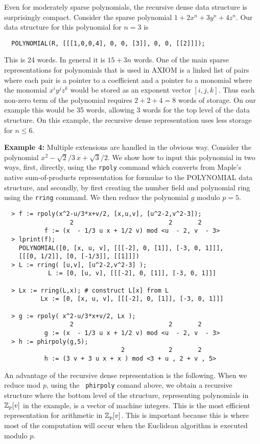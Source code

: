 \documentclass[10pt]{article}
\begin{document}
\medskip
{} Even for moderately sparse polynomials,
the recursive dense data structure is surprisingly compact. Consider
the sparse polynomial $1+2x^n+3y^n+4z^n.$ Our data structure for
this polynomial for $n=3$ is
\begin{verbatim}
  POLYNOMIAL(R, [[[1,0,0,4], 0, 0, [3]], 0, 0, [[2]]]);
\end{verbatim}
\noindent This is 24 words.  In general it is $15+3n$ words. One of
the main sparse representations for polynomials that is used in
AXIOM is a linked list of pairs where each pair is a pointer to a
coefficient and a pointer to a monomial where the monomial $x^i y^j
z^k$ would be stored as an exponent vector $[i,j,k]$.  Thus each
non-zero term of the polynomial requires $2+2+4=8$ words of storage.
On our example this would be 35 words, allowing 3 words for the top
level of the data structure. On this example, the recursive dense
representation uses less storage for $n \le 6$.

\medskip
\noindent
{\bf Example 4:} Multiple extensions are handled in the obvious way.
Consider the polynomial $x^2 - \sqrt{2}/3 \ x + \sqrt{3}/2.$
We show how to input this polynomial in two ways, first,
directly, using the {\tt rpoly} command which
converts from Maple's native sum-of-products
representation for formulae to the POLYNOMIAL data structure,
and secondly, by first creating the number field and
polynomial ring using the {\tt rring} command.
We then reduce the polynomial $g$ modulo $p=5$.
{
\begin{verbatim}
  > f := rpoly(x^2-u/3*x+v/2, [x,u,v], [u^2-2,v^2-3]);
                  2                          2       2
           f := (x  - 1/3 u x + 1/2 v) mod <u  - 2, v  - 3>
  > lprint(f);
    POLYNOMIAL([0, [x, u, v], [[[-2], 0, [1]], [-3, 0, 1]]],
    [[[0, 1/2]], [0, [-1/3]], [[1]]])
  > L := rring( [u,v], [u^2-2,v^2-3] );
            L := [0, [u, v], [[[-2], 0, [1]], [-3, 0, 1]]]

  > Lx := rring(L,x); # construct L[x] from L
          Lx := [0, [x, u, v], [[[-2], 0, [1]], [-3, 0, 1]]]

  > g := rpoly( x^2-u/3*x+v/2, Lx );
                  2                          2       2
           g := (x  - 1/3 u x + 1/2 v) mod <u  - 2, v  - 3>
  > h := phirpoly(g,5);
                                2            2       2
           h := (3 v + 3 u x + x ) mod <3 + u , 2 + v , 5>
\end{verbatim}
}

\medskip
\noindent An advantage of the recursive dense representation
is the following.  When we reduce mod $p$, using the {\tt
phirpoly} comand above, we obtain a recursive structure where the
bottom level of the structure, representing polynomials in
${\mathbb Z}_p[v]$ in the example, is a vector of machine integers.
This is the most efficient representation for arithmetic in ${\mathbb Z}_p[v]$.
This is important because this is where most of the computation will
occur when the Euclidean algorithm is executed modulo $p.$
\end{document}
